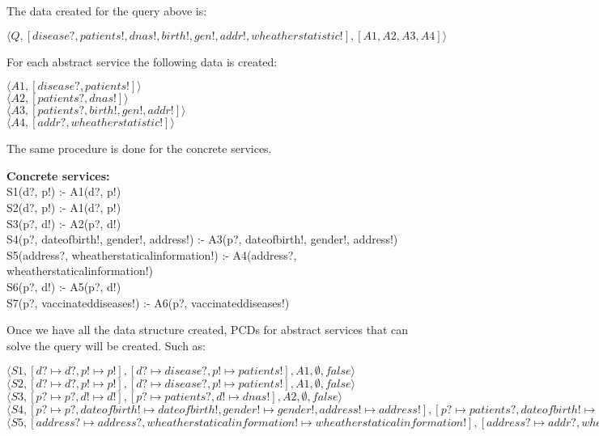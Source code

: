 \documentclass[12pt,a4paper,oneside]{report}
\begin{document}
The data created for the query above is:

\begin{center}
$\langle Q, [disease?, patients!, dnas!, birth!, gen!, addr!, wheatherstatistic!], [A1,A2,A3,A4] \rangle$
\end{center}

For each abstract service the following data is created:

\begin{flushleft}
$\langle A1, [disease?, patients!]\rangle$ \\
$\langle A2, [patients?,dnas!]\rangle$ \\
$\langle A3, [patients?, birth!, gen!, addr!]\rangle$ \\
$\langle A4, [addr?, wheatherstatistic!]\rangle$ \\
\end{flushleft}

The same procedure is done for the concrete services.

\begin{flushleft}
\textbf{Concrete services:} \\
S1(d?, p!) :- A1(d?, p!)\\
S2(d?, p!) :- A1(d?, p!)\\
S3(p?, d!) :- A2(p?, d!)\\
S4(p?, dateofbirth!, gender!, address!) :- A3(p?, dateofbirth!, gender!, address!)\\
S5(address?, wheatherstaticalinformation!) :- A4(address?, wheatherstaticalinformation!)\\
S6(p?, d!) :- A5(p?, d!)\\
S7(p?, vaccinateddiseases!) :- A6(p?, vaccinateddiseases!)\\
\end{flushleft}

Once we have all the data structure created, PCDs for abstract services that can solve the query will be created. Such as:

\begin{flushleft}
$\langle S1, [d? \longmapsto d?, p! \longmapsto p!], [d? \longmapsto disease?, p! \longmapsto patients!], A1, \emptyset, false\rangle$ \\
$\langle S2, [d? \longmapsto d?, p! \longmapsto p!], [d? \longmapsto disease?, p! \longmapsto patients!], A1, \emptyset, false\rangle$ \\
$\langle S3, [p? \longmapsto p?, d! \longmapsto d!], [p? \longmapsto patients?, d! \longmapsto dnas!], A2, \emptyset, false\rangle$ \\
$\langle S4, [p? \longmapsto p?, dateofbirth! \longmapsto dateofbirth!, gender! \longmapsto gender!, address! \longmapsto address!], [p? \longmapsto patients?, dateofbirth! \longmapsto birth!, gender! \longmapsto gen!, address! \longmapsto addr!], A3, \emptyset, false\rangle$ \\
$\langle S5, [address? \longmapsto address?, wheatherstaticalinformation! \longmapsto wheatherstaticalinformation!], [address? \longmapsto addr?, wheatherstaticalinformation! \longmapsto wheatherstatistic!], A4, \emptyset, false\rangle$ \\
\end{flushleft}
\end{document}
